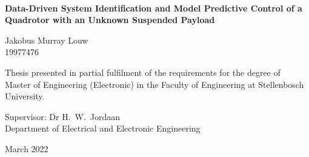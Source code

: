\graphicspath{{frontmatter/fig/}}

\begin{titlepage}
	\begin{center}
		
		
		
		~\vspace{-2em}
		
		{\sffamily \bfseries \huge Data-Driven System Identification and Model Predictive Control of a Quadrotor with an Unknown Suspended Payload \par}
		
		\vspace{4em}
		
		{\large {\Large  Jakobus Murray Louw} \\ 19977476 \par}
		
		\vspace{8em}
		
		{\large Thesis presented in partial fulfilment of the requirements for the degree of \\ Master of Engineering (Electronic) in the Faculty of Engineering at Stellenbosch University. \par}
		
		\vfill
		
		{\large {Supervisor}: Dr H.\ W.\ Jordaan\\
		Department of Electrical and Electronic Engineering \par}
		
		\vspace{10em}
		
		{\Large March 2022}
	\end{center}
\end{titlepage}
